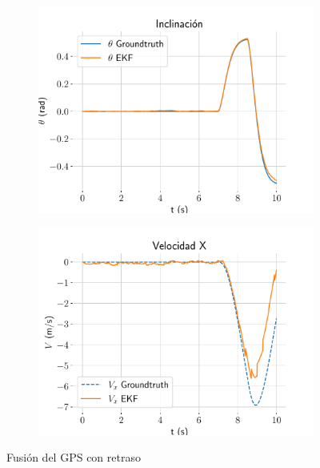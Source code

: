 \begin{figure}
\begin{subfigure}[t]{0.49\textwidth}
		\caption{}
		\label{fig:no-handle-yt}		
	\end{subfigure}
	\quad
	\hspace*{-0.5cm}
	\begin{subfigure}[t]{0.49\textwidth}
		\centering
		\includegraphics[width=\textwidth]{estimador_px4/im_simu/no_handle_delay/theta}
		\caption{}
		\label{fig:no-handle-theta}		
	\end{subfigure}
	\quad
	\begin{subfigure}[t]{0.49\textwidth}
		\centering
		\includegraphics[width=\textwidth]{estimador_px4/im_simu/no_handle_delay/vx}
		\caption{}
		\label{fig:no-handle-vx}		
	\end{subfigure}
	\quad
	\caption{Fusión del GPS con retraso}\label{fig:no-handle}
\end{figure}

